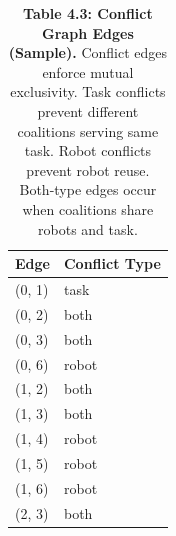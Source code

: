 \begin{table}[H]
\centering
\caption{\textbf{Table 4.3: Conflict Graph Edges (Sample).} Conflict edges enforce mutual exclusivity. Task conflicts prevent different coalitions serving same task. Robot conflicts prevent robot reuse. Both-type edges occur when coalitions share robots and task.}
\label{tab:4-3}
\small
\begin{tabular}{ll}
\toprule
\textbf{Edge} & \textbf{Conflict Type} \\
\midrule
\rowcolor{gray!15}
(0, 1) & task \\
(0, 2) & both \\
\rowcolor{gray!15}
(0, 3) & both \\
(0, 6) & robot \\
\rowcolor{gray!15}
(1, 2) & both \\
(1, 3) & both \\
\rowcolor{gray!15}
(1, 4) & robot \\
(1, 5) & robot \\
\rowcolor{gray!15}
(1, 6) & robot \\
(2, 3) & both \\
\bottomrule
\end{tabular}
\end{table}
